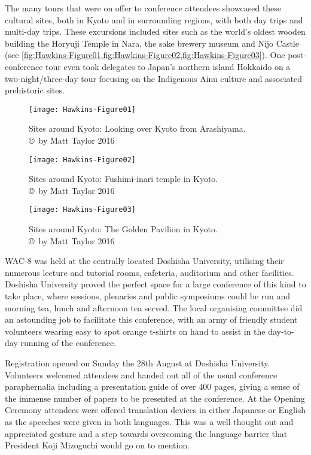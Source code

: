 The many tours that were on offer to conference attendees showcased these cultural sites, both in Kyoto and in surrounding regions, with both day trips and multi-day trips. These excursions included sites such as the world’s oldest wooden building the Horyuji Temple in Nara, the sake brewery museum and Nijo Castle (see \cref{fig:Hawkins-Figure01,fig:Hawkins-Figure02,fig:Hawkins-Figure03}). One post-conference tour even took delegates to Japan’s northern island Hokkaido on a two-night/three-day tour focusing on the Indigenous Ainu culture and associated prehistoric sites.

\begin{figure}[!tb] %
	\texttt{[image: Hawkins-Figure01]}
	\caption{Sites around Kyoto: Looking over Kyoto from Arashiyama.  
		{\normalfont\scriptsize \\ \copyright\ by Matt Taylor 2016}}
	\label{fig:Hawkins-Figure01}
\end{figure}

\begin{figure}[!tb] %
	\texttt{[image: Hawkins-Figure02]}
	\caption{Sites around Kyoto: Fushimi-inari temple in Kyoto. 
		{\normalfont\scriptsize \\ \copyright\ by Matt Taylor 2016}}
	\label{fig:Hawkins-Figure02}
\end{figure}

\begin{figure}[!tb] %
	\texttt{[image: Hawkins-Figure03]}
	\caption{Sites around Kyoto: The Golden Pavilion in Kyoto. 
		{\normalfont\scriptsize \\ \copyright\ by Matt Taylor 2016}}
	\label{fig:Hawkins-Figure03}
\end{figure}
  
WAC-8 was held at the centrally located Doshisha University, utilising their numerous lecture and tutorial rooms, cafeteria, auditorium and other facilities. Doshisha University proved the perfect space for a large conference of this kind to take place, where sessions, plenaries and public symposiums could be run and morning tea, lunch and afternoon tea served. The local organising committee did an astounding job to facilitate this conference, with an army of friendly student volunteers wearing easy to spot orange t-shirts on hand to assist in the day-to-day running of the conference. 

Registration opened on Sunday the 28th August at Doshisha University. Volunteers welcomed attendees and handed out all of the usual conference paraphernalia including a presentation guide of over \num{400} pages, giving a sense of the immense number of papers to be presented at the conference. At the Opening Ceremony attendees were offered translation devices in either Japanese or English as the speeches were given in both languages. This was a well thought out and appreciated gesture and a step towards overcoming the language barrier that President Koji Mizoguchi would go on to mention. 

